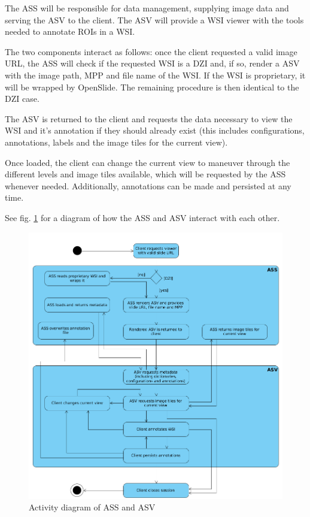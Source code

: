 The ASS will be responsible for data management, supplying image data and serving the ASV to the client. The ASV will provide a WSI viewer with the tools needed to annotate ROIs in a WSI.

The two components interact as follows: once the client requested a valid image URL, the ASS will check if the requested WSI is a DZI and, if so, render a ASV with the image path, MPP and file name of the WSI. If the WSI is proprietary, it will be wrapped by OpenSlide. The remaining procedure is then identical to the DZI case.

The ASV is returned to the client and requests the data necessary to view the WSI and it's annotation if they should already exist (this includes configurations, annotations, labels and the image tiles for the current view).

Once loaded, the client can change the current view to maneuver through the different levels and image tiles available, which will be requested by the ASS whenever needed. Additionally, annotations can be made and persisted at any time.

See fig. \ref{fig4_asUml} for a diagram of how the ASS and ASV interact with each other.

\begin{figure}[!h]
	\begin{center}
		\includegraphics[scale=0.4]{img/asUML.png}
		\caption{Activity diagram of ASS and ASV}
		\label{fig4_asUml}
	\end{center}
\end{figure}


